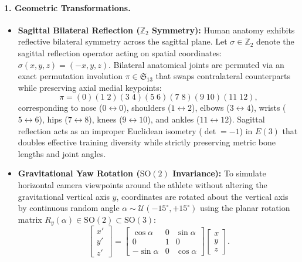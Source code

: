 \documentclass[runningheads]{llncs}
\begin{document}
\paragraph{1. Geometric Transformations.}
\begin{itemize}
    \item \textbf{Sagittal Bilateral Reflection ($\mathbb{Z}_2$ Symmetry):} Human anatomy exhibits reflective bilateral symmetry across the sagittal plane. Let $\sigma \in \mathbb{Z}_2$ denote the sagittal reflection operator acting on spatial coordinates: $\sigma(x, y, z) = (-x, y, z)$. Bilateral anatomical joints are permuted via an exact permutation involution $\pi \in \mathfrak{S}_{13}$ that swaps contralateral counterparts while preserving axial medial keypoints:
    \begin{equation}
        \pi = (0)(1 \; 2)(3 \; 4)(5 \; 6)(7 \; 8)(9 \; 10)(11 \; 12),
    \end{equation}
    corresponding to nose ($0 \leftrightarrow 0$), shoulders ($1 \leftrightarrow 2$), elbows ($3 \leftrightarrow 4$), wrists ($5 \leftrightarrow 6$), hips ($7 \leftrightarrow 8$), knees ($9 \leftrightarrow 10$), and ankles ($11 \leftrightarrow 12$). Sagittal reflection acts as an improper Euclidean isometry ($\det = -1$) in $E(3)$ that doubles effective training diversity while strictly preserving metric bone lengths and joint angles.
    \item \textbf{Gravitational Yaw Rotation ($\mathrm{SO}(2)$ Invariance):} To simulate horizontal camera viewpoints around the athlete without altering the gravitational vertical axis $y$, coordinates are rotated about the vertical axis by continuous random angle $\alpha \sim \mathcal{U}(-15^\circ, +15^\circ)$ using the planar rotation matrix $R_y(\alpha) \in \mathrm{SO}(2) \subset \mathrm{SO}(3)$:
    \begin{equation}
    \label{eq:yaw_rotation}
        \begin{bmatrix} x' \\ y' \\ z' \end{bmatrix} = \begin{bmatrix} \cos\alpha & 0 & \sin\alpha \\ 0 & 1 & 0 \\ -\sin\alpha & 0 & \cos\alpha \end{bmatrix} \begin{bmatrix} x \\ y \\ z \end{bmatrix}.

\end{equation}
\end{itemize}
\end{document}
